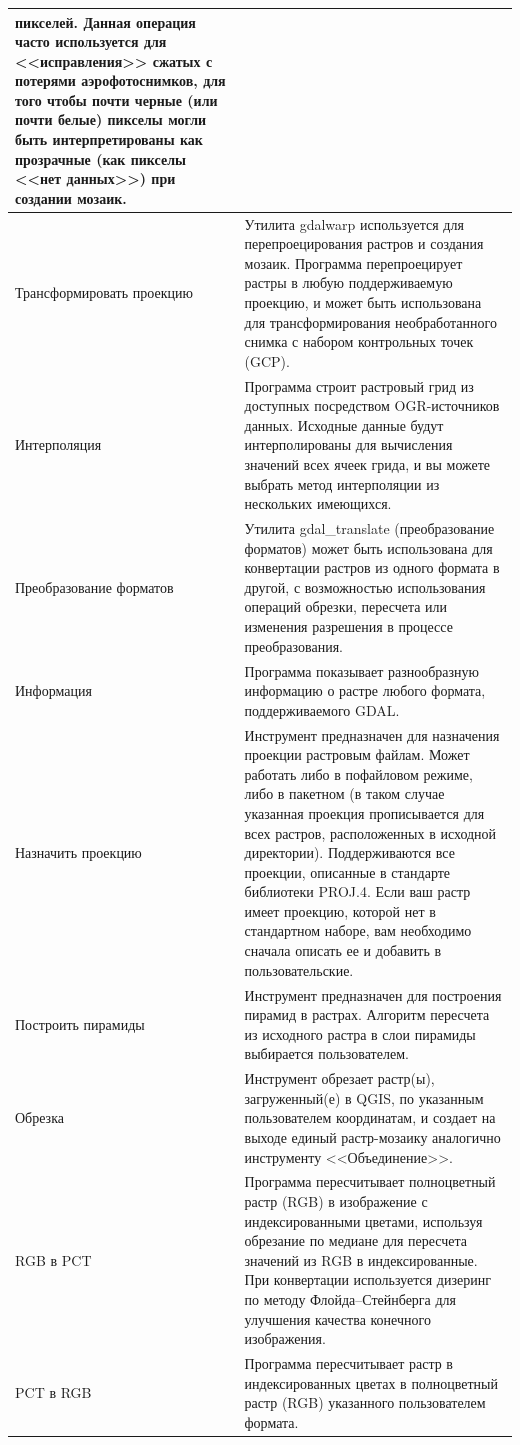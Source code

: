 {\begin{longtable}{|p{3cm}|p{13cm}|}
 пикселей. Данная операция часто используется для <<исправления>> сжатых с
 потерями аэрофотоснимков, для того чтобы почти черные (или почти белые)
 пикселы могли быть интерпретированы как прозрачные (как пикселы <<нет данных>>)
 при создании мозаик.\\
\hline Трансформировать проекцию & Утилита gdalwarp используется для
 перепроецирования растров и создания мозаик. Программа перепроецирует растры
 в любую поддерживаемую проекцию, и может быть использована для трансформирования
 необработанного снимка с набором контрольных точек (GCP). \\
\hline Интерполяция & Программа строит растровый грид из доступных посредством
 OGR-источников данных. Исходные данные будут интерполированы для вычисления
 значений всех ячеек грида, и вы можете выбрать метод интерполяции из нескольких
 имеющихся.\\
\hline Преобразование форматов & Утилита gdal\_translate (преобразование
 форматов) может быть использована для конвертации растров из одного формата в
 другой, с возможностью использования операций обрезки, пересчета или изменения
 разрешения в процессе преобразования.\\
\hline Информация & Программа показывает разнообразную информацию о растре
 любого формата, поддерживаемого GDAL. \\
\hline Назначить проекцию &  Инструмент предназначен для назначения проекции
 растровым файлам. Может работать либо в пофайловом режиме, либо в пакетном (в таком
 случае указанная проекция прописывается для всех растров, расположенных в
 исходной директории). Поддерживаются все проекции, описанные в
 стандарте библиотеки PROJ.4. Если ваш растр имеет проекцию, которой нет в стандартном наборе, вам
 необходимо сначала описать ее и добавить в пользовательские. \\
\hline Построить пирамиды &  Инструмент предназначен для построения пирамид в
 растрах. Алгоритм пересчета из исходного растра в слои пирамиды выбирается
 пользователем.\\
\hline Обрезка & Инструмент обрезает растр(ы), загруженный(е) в QGIS, по
 указанным пользователем координатам, и создает на выходе единый растр-мозаику
 аналогично инструменту <<Объединение>>. \\
\hline RGB в PCT &  Программа пересчитывает полноцветный растр (RGB) в изображение
 с индексированными цветами, используя обрезание по медиане для пересчета значений
 из RGB в индексированные. При конвертации используется дизеринг по методу Флойда--Стейнберга
 для улучшения качества конечного изображения. \\
\hline PCT в RGB &  Программа пересчитывает растр в индексированных цветах в
 полноцветный растр (RGB) указанного пользователем формата.\\
\hline
\end{longtable}

}
